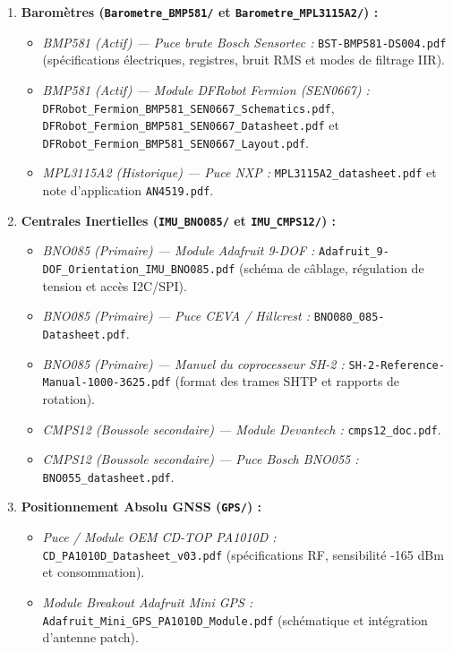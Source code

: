 \documentclass[../Materiel.tex]{subfiles}
\begin{document}
\begin{enumerate}
    \item \textbf{Baromètres (\texttt{Barometre\_BMP581/} et \texttt{Barometre\_MPL3115A2/}) :}
    \begin{itemize}
        \item \textit{BMP581 (Actif) — Puce brute Bosch Sensortec :} \texttt{BST-BMP581-DS004.pdf} (spécifications électriques, registres, bruit RMS et modes de filtrage IIR).
        \item \textit{BMP581 (Actif) — Module DFRobot Fermion (SEN0667) :} \texttt{DFRobot\_Fermion\_BMP581\_SEN0667\_Schematics.pdf}, \texttt{DFRobot\_Fermion\_BMP581\_SEN0667\_Datasheet.pdf} et \texttt{DFRobot\_Fermion\_BMP581\_SEN0667\_Layout.pdf}.
        \item \textit{MPL3115A2 (Historique) — Puce NXP :} \texttt{MPL3115A2\_datasheet.pdf} et note d'application \texttt{AN4519.pdf}.
    \end{itemize}

    \item \textbf{Centrales Inertielles (\texttt{IMU\_BNO085/} et \texttt{IMU\_CMPS12/}) :}
    \begin{itemize}
        \item \textit{BNO085 (Primaire) — Module Adafruit 9-DOF :} \texttt{Adafruit\_9-DOF\_Orientation\_IMU\_BNO085.pdf} (schéma de câblage, régulation de tension et accès I2C/SPI).
        \item \textit{BNO085 (Primaire) — Puce CEVA / Hillcrest :} \texttt{BNO080\_085-Datasheet.pdf}.
        \item \textit{BNO085 (Primaire) — Manuel du coprocesseur SH-2 :} \texttt{SH-2-Reference-Manual-1000-3625.pdf} (format des trames SHTP et rapports de rotation).
        \item \textit{CMPS12 (Boussole secondaire) — Module Devantech :} \texttt{cmps12\_doc.pdf}.
        \item \textit{CMPS12 (Boussole secondaire) — Puce Bosch BNO055 :} \texttt{BNO055\_datasheet.pdf}.
    \end{itemize}

    \item \textbf{Positionnement Absolu GNSS (\texttt{GPS/}) :}
    \begin{itemize}
        \item \textit{Puce / Module OEM CD-TOP PA1010D :} \texttt{CD\_PA1010D\_Datasheet\_v03.pdf} (spécifications RF, sensibilité -165 dBm et consommation).
        \item \textit{Module Breakout Adafruit Mini GPS :} \texttt{Adafruit\_Mini\_GPS\_PA1010D\_Module.pdf} (schématique et intégration d'antenne patch).
    \end{itemize}


\end{enumerate}
\end{document}
